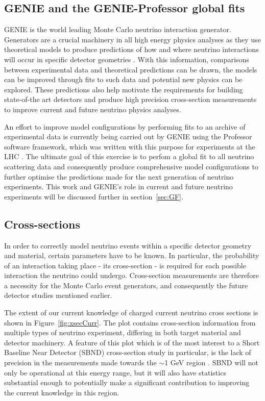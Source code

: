 \subsection{GENIE and the GENIE-Professor global fits}

GENIE is the world leading Monte Carlo neutrino interaction generator. Generators are a crucial machinery in all high energy physics analyses as they use theoretical models to produce predictions of how and where neutrino interactions will occur in specific detector geometries \cite{genie}. With this information, comparisons between experimental data and theoretical predictions can be drawn, the models can be improved through fits to such data and potential new physics can be explored. These predictions also help motivate the requirements for building state-of-the art detectors and produce high precision cross-section measurements to improve current and future neutrino physics analyses. 

    An effort to improve model configurations by performing fits to an archive of experimental data is currently being carried out by GENIE using the Professor software framework, which was written with this purpose for experiments at the LHC \cite{prof}. The ultimate goal of this exercise is to perfom a global fit to all neutrino scattering data and consequently produce comprehensive model configurations to further optimise the predictions made for the next generation of neutrino experiments. This work and GENIE's role in current and future neutrino experiments will be discussed further in section~\ref{sec:GF}.

\subsection{Cross-sections}
   
    In order to correctly model neutrino events within a specific detector geometry and material, certain parameters have to be known. In particular, the probability of an interaction taking place - its cross-section - is required for each possible interaction the neutrino could undergo. Cross-section measurements are therefore a necessity for the Monte Carlo event generators, and consequently the future detector studies mentioned earlier. 
    
    The extent of our current knowledge of charged current neutrino cross sections is shown in Figure~\ref{fig:xsecCurr}. The plot contains cross-section information from multiple types of neutrino experiment, differing in both target material and detector machinery. A feature of this plot which is of the most interest to a Short Baseline Near Detector (SBND) cross-section study in particular, is the lack of precision in the measurements made towards the $\sim$1 GeV region
    \cite{xsecCurr}. SBND will not only be operational at this energy range, but it will also have statistics substantial enough to potentially make a significant contribution to improving the current knowledge in this region.

